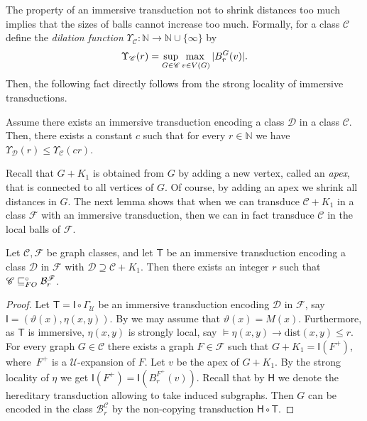 \documentclass{lmcs}
\newcommand{\Cc}{\mathscr{C}}
\newcommand{\Dd}{\mathscr{D}}
\newcommand{\Ff}{\mathscr{F}}
\renewcommand{\FO}{{\rm FO}}
\newcommand{\rloc}[2]{\ensuremath{\mathcal{B}_{#1}^{#2}}}
\theoremstyle{definition}
\DeclareMathOperator{\join}{+}
\begin{document}
The property of an immersive transduction not to shrink distances too much implies that the sizes of balls cannot increase too much. Formally,
for a class $\mathscr C$ define the \emph{dilation function} $\Upsilon_{\mathscr C}:\mathbb N\rightarrow\mathbb N\cup\{\infty\}$ by
\[
\Upsilon_{\mathscr C}(r)=\adjustlimits\sup_{G\in \mathscr C}\max_{v\in V(G)}|B_r^G(v)|.
\] 
Then, the following fact directly follows from the strong locality of immersive transductions.
\begin{fact}
	\label{fact:dilation}
	Assume there exists an immersive  transduction encoding a class $\mathscr D$ in a class $\mathscr C$. Then, there exists a constant $c$ such that for every $r\in\mathbb N$ we have
	$\Upsilon_{\mathscr D}(r)\leq \Upsilon_{\mathscr C}(cr)$.
\end{fact}


Recall that $G\join K_1$ is obtained from $G$ by adding a 
new vertex, called an \emph{apex}, that is connected to all vertices of 
$G$. Of course, by adding an apex we shrink all distances in $G$. The
next lemma shows that when we can transduce $\Cc\join K_1$ in a 
class $\Ff$ with an immersive transduction, then we can in fact transduce 
$\Cc$ in the local balls of 
$\Ff$.


\begin{lem}
	\label{cor:apex}
	Let $\Cc,\Ff$ be graph classes, and let $\mathsf T$ be an 
	immersive transduction encoding a class $\Dd$ in $\Ff$ with
	$\Dd\supseteq \Cc\join K_1$.
	Then there exists an integer $r$ such that $\Cc\sqsubseteq_\FO^\circ\rloc{r}{\Ff}$.
\end{lem}
\begin{proof}
	Let $\mathsf T=\mathsf I\circ\Gamma_{\mathcal U}$ be an immersive transduction encoding $\Dd$ in $\Ff$, say $\mathsf{I}=(\vartheta(x), \eta(x,y))$. By  we may assume that $\vartheta(x)=M(x)$. Furthermore, as $\mathsf{T}$ is immersive, $\eta(x,y)$ is strongly local, say $\models \eta(x,y)\rightarrow \mathrm{dist}(x,y)\leq r$. 
	For every graph $G\in\Cc$ there exists a graph $F\in\Ff$ such that $G\join K_1=\mathsf I(F^+)$, where~$F^+$ is a ${\mathcal U}$-expansion of $F$. Let $v$ be the apex of $G\join K_1$.
	By the strong locality of $\eta$ we get $\mathsf I(F^+)=\mathsf I(B_r^{F^+}(v))$. 
	Recall that by $\mathsf{H}$ we denote the hereditary transduction allowing to take induced subgraphs. Then $G$ can be encoded 
	in the class $\rloc{r}{\Cc}$ by the non-copying transduction $\mathsf H\circ\mathsf T$. 
\end{proof}
\end{document}
